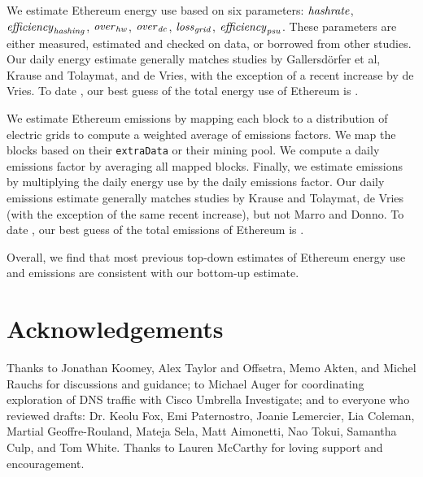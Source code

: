 We estimate Ethereum energy use based on six parameters: $\mathit{hashrate}$, $\mathit{efficiency}_\mathit{hashing}$, $\mathit{over}_\mathit{hw}$, $\mathit{over}_\mathit{dc}$, $\mathit{loss}_\mathit{grid}$, $\mathit{efficiency}_\mathit{psu}$. These parameters are either measured, estimated and checked on data, or borrowed from other studies. Our daily energy estimate generally matches studies by Gallersdörfer et al, Krause and Tolaymat, and de Vries, with the exception of a recent increase by de Vries. To date {\todaterange}, our best guess of the total energy use of Ethereum is .

We estimate Ethereum emissions by mapping each block to a distribution of electric grids to compute a weighted average of emissions factors. We map the blocks based on their \texttt{extraData} or their mining pool. We compute a daily emissions factor by averaging all mapped blocks. Finally, we estimate emissions by multiplying the daily energy use by the daily emissions factor. Our daily emissions estimate generally matches studies by Krause and Tolaymat, de Vries (with the exception of the same recent increase), but not Marro and Donno. To date {\todaterange}, our best guess of the total emissions of Ethereum is . 

Overall, we find that most previous top-down estimates of Ethereum energy use and emissions are consistent with our bottom-up estimate.

\section{Acknowledgements}

Thanks to Jonathan Koomey, Alex Taylor and Offsetra, Memo Akten, and Michel Rauchs for discussions and guidance; to Michael Auger for coordinating exploration of DNS traffic with Cisco Umbrella Investigate; and to everyone who reviewed drafts: Dr. Keolu Fox, Emi Paternostro, Joanie Lemercier, Lia Coleman, Martial Geoffre-Rouland, Mateja Sela, Matt Aimonetti, Nao Tokui, Samantha Culp, and Tom White. Thanks to Lauren McCarthy for loving support and encouragement.